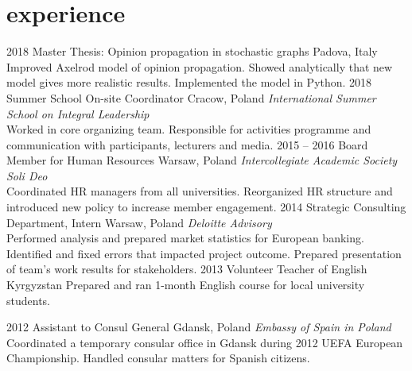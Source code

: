 \documentclass[]{appsilon} %
\begin{document}
\vspace{0cm}
\section{experience}

\begin{entrylist}
\entry
{2018}
{Master Thesis: Opinion propagation in stochastic graphs}
{Padova, Italy}
{Improved Axelrod model of opinion propagation. Showed analytically that new model gives more realistic results. Implemented the model in Python.}
\entry
{2018}
{Summer School On-site Coordinator}
{Cracow, Poland}
{\emph{International Summer School on Integral Leadership} \\
	Worked in core organizing team. Responsible for activities programme and communication with participants, lecturers and media.}
\entry
{2015 -- 2016}
{Board Member for Human Resources}
{Warsaw, Poland}
{\emph{Intercollegiate Academic Society Soli Deo} \\
Coordinated HR managers from all universities. Reorganized HR structure and introduced new policy to increase member engagement.
}
\entry
{2014}
{Strategic Consulting Department, Intern}
{Warsaw, Poland}
{\emph{Deloitte Advisory} \\
Performed analysis and prepared market statistics for European banking. Identified and fixed errors that impacted project outcome. Prepared presentation of team's work results for stakeholders. }
\entry
{2013}
{Volunteer Teacher of English}
{Kyrgyzstan}
{Prepared and ran 1-month English course for local university students.}

\entry
{2012}
{Assistant to Consul General}
{Gdansk, Poland}
{\emph{Embassy of Spain in Poland} \\
Coordinated a temporary consular office in Gdansk during 2012 UEFA European Championship. Handled consular matters for Spanish citizens.  
}
\end{entrylist}


\end{document}
